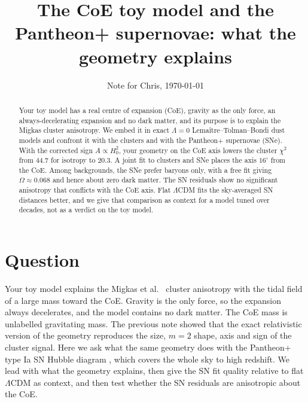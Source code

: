 \documentclass[10pt,twocolumn,letterpaper]{article}
\title{\vspace{-0.6in}\Large The CoE toy model and the Pantheon+ supernovae: what the geometry explains}
\author{Note for Chris, \today}
\date{\vspace{-0.35in}}
\begin{document}
\maketitle
\begin{abstract}\noindent
Your toy model has a real centre of expansion (CoE), gravity as the only force, an always-decelerating expansion and no dark matter, and its purpose is to explain the Migkas cluster anisotropy. We embed it in exact $\Lambda=0$ Lema\^itre--Tolman--Bondi dust models and confront it with the clusters and with the Pantheon+ supernovae (SNe). With the corrected sign $A\propto H_0^2$, your geometry on the CoE axis lowers the cluster $\chi^2$ from 44.7 for isotropy to 20.3. A joint fit to clusters and SNe places the axis $16^\circ$ from the CoE. Among backgrounds, the SNe prefer baryons only, with a free fit giving $\Omega\approx0.068$ and hence about zero dark matter. The SN residuals show no significant anisotropy that conflicts with the CoE axis. Flat $\Lambda$CDM fits the sky-averaged SN distances better, and we give that comparison as context for a model tuned over decades, not as a verdict on the toy model.
\end{abstract}

\section{Question}
Your toy model explains the Migkas et al.\ \cite{Migkas2020,Migkas2021} cluster anisotropy with the tidal field of a large mass toward the CoE. Gravity is the only force, so the expansion always decelerates, and the model contains no dark matter. The CoE mass is unlabelled gravitating mass. The previous note showed that the exact relativistic version of the geometry reproduces the size, $m=2$ shape, axis and sign of the cluster signal. Here we ask what the same geometry does with the Pantheon+ type Ia SN Hubble diagram \cite{Scolnic2022,Brout2022}, which covers the whole sky to high redshift. We lead with what the geometry explains, then give the SN fit quality relative to flat $\Lambda$CDM as context, and then test whether the SN residuals are anisotropic about the CoE.
\end{document}
